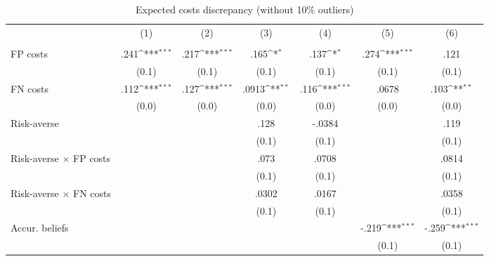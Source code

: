\begin{table}[htbp]\centering
\def\sym#1{\ifmmode^{#1}\else\(^{#1}\)\fi}
\caption{Expected costs discrepancy (without 10\% outliers)}
\begin{tabular}{l*{6}{c}}
\hline\hline
                &\multicolumn{1}{c}{(1)}&\multicolumn{1}{c}{(2)}&\multicolumn{1}{c}{(3)}&\multicolumn{1}{c}{(4)}&\multicolumn{1}{c}{(5)}&\multicolumn{1}{c}{(6)}\\
                &\multicolumn{1}{c}{}&\multicolumn{1}{c}{}&\multicolumn{1}{c}{}&\multicolumn{1}{c}{}&\multicolumn{1}{c}{}&\multicolumn{1}{c}{}\\
\hline
FP costs        &     .241\sym{***}&     .217\sym{***}&     .165\sym{*}  &     .137\sym{*}  &     .274\sym{***}&     .121         \\
                &    (0.1)         &    (0.1)         &    (0.1)         &    (0.1)         &    (0.1)         &    (0.1)         \\
FN costs        &     .112\sym{***}&     .127\sym{***}&    .0913\sym{**} &     .116\sym{***}&    .0678         &     .103\sym{**} \\
                &    (0.0)         &    (0.0)         &    (0.0)         &    (0.0)         &    (0.0)         &    (0.0)         \\
Risk-averse     &                  &                  &     .128         &   -.0384         &                  &     .119         \\
                &                  &                  &    (0.1)         &    (0.1)         &                  &    (0.1)         \\
Risk-averse $\times$ FP costs&                  &                  &     .073         &    .0708         &                  &    .0814         \\
                &                  &                  &    (0.1)         &    (0.1)         &                  &    (0.1)         \\
Risk-averse $\times$ FN costs&                  &                  &    .0302         &    .0167         &                  &    .0358         \\
                &                  &                  &    (0.1)         &    (0.1)         &                  &    (0.1)         \\
Accur. beliefs  &                  &                  &                  &                  &    -.219\sym{***}&    -.259\sym{***}\\
                &                  &                  &                  &                  &    (0.1)         &    (0.1)         \\

\end{tabular}
\end{table}
